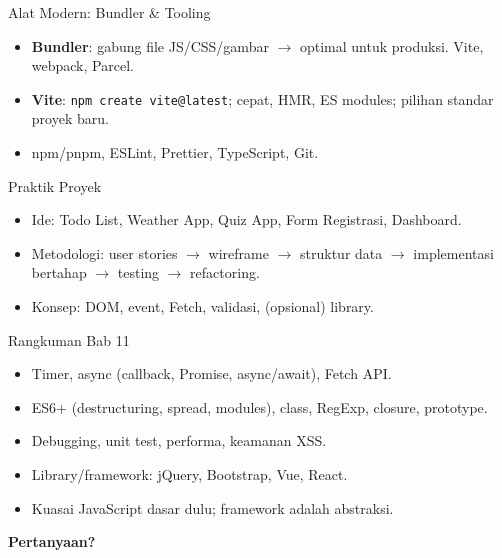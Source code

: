 \documentclass[handout]{beamer}
\begin{document}
\begin{frame}{Alat Modern: Bundler \& Tooling}
	\begin{itemize}
		\item \textbf{Bundler}: gabung file JS/CSS/gambar $\to$ optimal untuk produksi. Vite, webpack, Parcel.
		\item \textbf{Vite}: \texttt{npm create vite@latest}; cepat, HMR, ES modules; pilihan standar proyek baru.
		\item npm/pnpm, ESLint, Prettier, TypeScript, Git.
	\end{itemize}
\end{frame}

\begin{frame}{Praktik Proyek}
	\begin{itemize}
		\item Ide: Todo List, Weather App, Quiz App, Form Registrasi, Dashboard.
		\item Metodologi: user stories $\to$ wireframe $\to$ struktur data $\to$ implementasi bertahap $\to$ testing $\to$ refactoring.
		\item Konsep: DOM, event, Fetch, validasi, (opsional) library.
	\end{itemize}
\end{frame}

\begin{frame}{Rangkuman Bab 11}
	\begin{itemize}
		\item Timer, async (callback, Promise, async/await), Fetch API.
		\item ES6+ (destructuring, spread, modules), class, RegExp, closure, prototype.
		\item Debugging, unit test, performa, keamanan XSS.
		\item Library/framework: jQuery, Bootstrap, Vue, React.
		\item Kuasai JavaScript dasar dulu; framework adalah abstraksi.
	\end{itemize}
\end{frame}

\begin{frame}{}
	\centering
	\vfill
	\textbf{\Large Pertanyaan?}
	\vfill
\end{frame}
\end{document}
